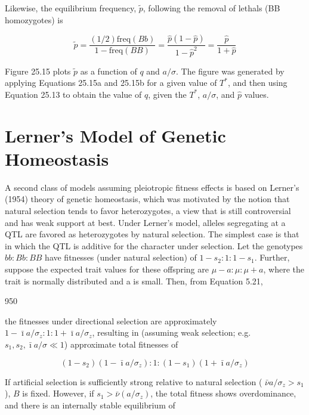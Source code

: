 \documentclass{article}
\begin{document}
Likewise, the equilibrium frequency,  $ \tilde{p} $, following the removal of lethals (BB homozygotes) is

\begin{equation}
\widetilde{p}=\frac{(1/2)\mathrm{freq}(Bb)}{1-\mathrm{freq}(BB)}=\frac{\widehat{p}\left(1-\widehat{p}\right)}{1-\widehat{p}^{2}}=\frac{\widehat{p}}{1+\widehat{p}}
\tag{25.15b}
\label{eq:25_15b}
\end{equation}

Figure 25.15 plots  $ \widetilde{p} $ as a function of  $ q $ and  $ a/\sigma $. The figure was generated by applying Equations 25.15a and 25.15b for a given value of  $ T^* $, and then using Equation 25.13 to obtain the value of  $ q $, given the  $ T^* $,  $ a/\sigma $, and  $ \widehat{p} $ values.

\section{Lerner's Model of Genetic Homeostasis}
A second class of models assuming pleiotropic fitness effects is based on Lerner's (1954) theory of genetic homeostasis, which was motivated by the notion that natural selection tends to favor heterozygotes, a view that is still controversial and has weak support at best. Under Lerner's model, alleles segregating at a QTL are favored as heterozygotes by natural selection. The simplest case is that in which the QTL is additive for the character under selection. Let the genotypes  $ bb:Bb:BB $ have fitnesses (under natural selection) of  $ 1-s_{2}:1:1-s_{1} $. Further, suppose the expected trait values for these offspring are  $ \mu-a:\mu:\mu+a $, where the trait is normally distributed and a is small. Then, from Equation 5.21,

950

the fitnesses under directional selection are approximately  $ 1 - \bar{\imath} a / \sigma_z : 1 : 1 + \bar{\imath} a / \sigma_z $, resulting in (assuming weak selection; e.g.  $ s_1, s_2, \bar{\imath} a / \sigma \ll 1 $) approximate total fitnesses of

\begin{equation}
(1-s_{2})(1-\bar{\imath}a/\sigma_{z}):1:(1-s_{1})(1+\bar{\imath}a/\sigma_{z})
\end{equation}

If artificial selection is sufficiently strong relative to natural selection ( $ \bar{\nu}a/\sigma_z > s_1 $),  $ B $ is fixed. However, if  $ s_1 > \bar{\nu}(a/\sigma_z) $, the total fitness shows overdominance, and there is an internally stable equilibrium of
\end{document}
